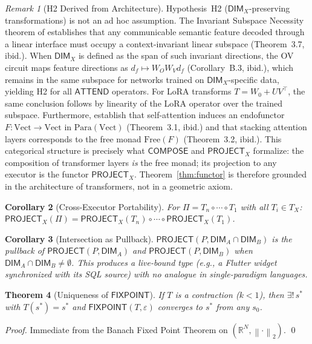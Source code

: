 \documentclass[10pt,twocolumn]{article}
\theoremstyle{plain}
\newtheorem{theorem}{Theorem}[section]
\newtheorem{corollary}[theorem]{Corollary}
\theoremstyle{definition}
\theoremstyle{remark}
\newtheorem{remark}[theorem]{Remark}
\newcommand{\RR}{\mathbb{R}}
\newcommand{\Compose}{\mathsf{COMPOSE}}
\newcommand{\Fixpoint}{\mathsf{FIXPOINT}}
\newcommand{\Project}{\mathsf{PROJECT}}
\newcommand{\Attend}{\mathsf{ATTEND}}
\newcommand{\DimX}{\mathsf{DIM}_X}
\newcommand{\norm}[1]{\left\|#1\right\|}
\begin{document}
\begin{remark}[H2 Derived from Architecture]
\label{rem:h2}
Hypothesis~H2 ($\DimX$-preserving transformations) is not an ad hoc
assumption. The Invariant Subspace Necessity theorem of
\citet{suarez2026invariant} establishes that any communicable semantic feature
decoded through a linear interface must occupy a context-invariant linear
subspace (Theorem~3.7, ibid.). When $\DimX$ is defined as the span of such
invariant directions, the OV circuit maps feature directions as
$d_f \mapsto W_O W_V d_f$ (Corollary~B.3, ibid.), which remains in the same
subspace for networks trained on $\DimX$-specific data, yielding H2 for all
$\Attend$ operators. For LoRA transforms $T=W_0+UV^\top$, the same conclusion
follows by linearity of the LoRA operator over the trained subspace.
Furthermore, \citet{oneill2025endofunctor} establish that self-attention
induces an endofunctor $F\colon\mathrm{Vect}\to\mathrm{Vect}$ in
$\mathrm{Para}(\mathrm{Vect})$ (Theorem~3.1, ibid.) and that stacking attention
layers corresponds to the free monad $\mathrm{Free}(F)$ (Theorem~3.2, ibid.).
This categorical structure is precisely what $\Compose$ and $\Project_X$
formalize: the composition of transformer layers \emph{is} the free monad;
its projection to any executor is the functor $\Project_X$.
Theorem~\ref{thm:functor} is therefore grounded in the architecture of
transformers, not in a geometric axiom.
\end{remark}

\begin{corollary}[Cross-Executor Portability]
\label{cor:portability}
For $\Pi=T_n\circ\cdots\circ T_1$ with all $T_i\in T_X$:
$\Project_X(\Pi)=\Project_X(T_n)\circ\cdots\circ\Project_X(T_1)$.
\end{corollary}

\begin{corollary}[Intersection as Pullback]
\label{cor:pullback}
$\Project(P,\mathsf{DIM}_A\cap\mathsf{DIM}_B)$ is the pullback of
$\Project(P,\mathsf{DIM}_A)$ and $\Project(P,\mathsf{DIM}_B)$ when
$\mathsf{DIM}_A\cap\mathsf{DIM}_B\neq\emptyset$.
This produces a live-bound type (e.g., a Flutter widget synchronized with
its SQL source) with no analogue in single-paradigm languages.
\end{corollary}

\begin{theorem}[Uniqueness of $\Fixpoint$]
\label{thm:fixpoint}
If $T$ is a contraction ($k<1$), then $\exists!\,s^*$ with $T(s^*)=s^*$
and $\Fixpoint(T,\varepsilon)$ converges to $s^*$ from any $s_0$.
\end{theorem}
\begin{proof}
Immediate from the Banach Fixed Point Theorem on $(\RR^N,\norm{\cdot}_2)$. \qed
\end{proof}
\end{document}
